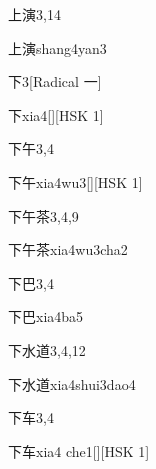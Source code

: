 \begin{entry}{上演}{3,14}
  \begin{phonetics}{上演}{shang4yan3}
  \end{phonetics}
\end{entry}

\begin{entry}{下}{3}[Radical 一]
  \begin{phonetics}{下}{xia4}[][HSK 1]
  \end{phonetics}
\end{entry}

\begin{entry}{下午}{3,4}
  \begin{phonetics}{下午}{xia4wu3}[][HSK 1]
  \end{phonetics}
\end{entry}

\begin{entry}{下午茶}{3,4,9}
  \begin{phonetics}{下午茶}{xia4wu3cha2}
  \end{phonetics}
\end{entry}

\begin{entry}{下巴}{3,4}
  \begin{phonetics}{下巴}{xia4ba5}
  \end{phonetics}
\end{entry}

\begin{entry}{下水道}{3,4,12}
  \begin{phonetics}{下水道}{xia4shui3dao4}
  \end{phonetics}
\end{entry}

\begin{entry}{下车}{3,4}
  \begin{phonetics}{下车}{xia4 che1}[][HSK 1]
  \end{phonetics}
\end{entry}

